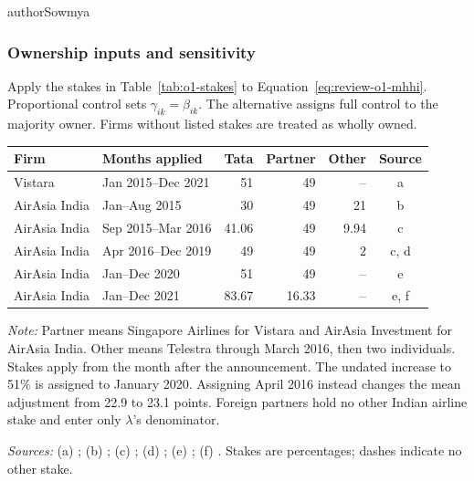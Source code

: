 \begin{mergedcontribution}{authorSowmya}
\subsubsection{Ownership inputs and sensitivity}
\label{app:o1-stakes}
Apply the stakes in Table~\ref{tab:o1-stakes} to Equation~\ref{eq:review-o1-mhhi}. Proportional control sets $\gamma_{ik}=\beta_{ik}$. The alternative assigns full control to the majority owner. Firms without listed stakes are treated as wholly owned.

\begin{minipage}{\linewidth}
\label{tab:o1-stakes}
\centering
{\footnotesize{}\setlength{\tabcolsep}{4pt}
\fontsize{10}{12}\selectfont{}\setlength{\tabcolsep}{3pt}
\renewcommand{\arraystretch}{1.15}
\begin{tabular}{|l|l|r|r|r|c|}
\hline
\textbf{Firm} & \textbf{Months applied} & \textbf{Tata} & \textbf{Partner} & \textbf{Other} & \textbf{Source} \\
\hline
Vistara & Jan 2015--Dec 2021 & 51 & 49 & -- & a \\
\hline
AirAsia India & Jan--Aug 2015 & 30 & 49 & 21 & b \\
\hline
AirAsia India & Sep 2015--Mar 2016 & 41.06 & 49 & 9.94 & c \\
\hline
AirAsia India & Apr 2016--Dec 2019 & 49 & 49 & 2 & c, d \\
\hline
AirAsia India & Jan--Dec 2020 & 51 & 49 & -- & e \\
\hline
AirAsia India & Jan--Dec 2021 & 83.67 & 16.33 & -- & e, f \\
\hline
\end{tabular}\par}
\vspace{4pt}
{\footnotesize{}\raggedright
\textit{Note:} Partner means Singapore Airlines for Vistara and AirAsia Investment for AirAsia India. Other means Telestra through March 2016, then two individuals. Stakes apply from the month after the announcement. The undated increase to 51\% is assigned to January 2020. Assigning April 2016 instead changes the mean adjustment from 22.9 to 23.1 points. Foreign partners hold no other Indian airline stake and enter only $\lambda$'s denominator.\par
\textit{Sources:} (a) \textcite{sia2015annual,sia2022merger}; (b) \textcite{airasia2013jv}; (c) \textcite{tata2016airasia}; (d) \textcite{airasia2018q4}; (e) \textcite{airasia2021disposal}; (f) \textcite{airasia2021results}. Stakes are percentages; dashes indicate no other stake.\par}
\end{minipage}


\end{mergedcontribution}
